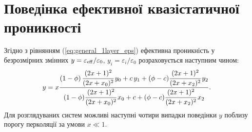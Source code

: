 \documentclass[14pt,twoside]{vakthesis}
\begin{document}
\section{Поведінка ефективної квазістатичної  проникності}

Згідно з рівнянням (\ref{eq:general_1layer_eps}) ефективна проникність у безрозмірних змінних $y = \varepsilon_{\rm eff}/\varepsilon_0$, $y_i = \varepsilon_i/\varepsilon_0$ розраховується наступним чином:
\begin{equation} \label{eq:general_1layer_y}
y =x \frac{(1-\phi)\, \cfrac{(2x+1)^2}{(2x+x_0)^2}\,y_0 +
	c\, y_1 +(\phi-c)\cfrac{(2x+1)^2}{(2x+x_2)^2}\,y_2}{(1-\phi) \cfrac{(2x+1)^2}{(2x+x_0)^2}\, x_0
	+ c +(\phi -c)\cfrac{(2x+1)^2}{(2x+x_2)^2}\, x_2}.
\end{equation}
Для розглядуваних систем можливі наступні чотири випадки поведінки $y$ поблизу порогу перколяції за умови $x \ll 1$.
\end{document}
